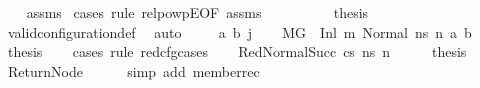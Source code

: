 \begin{isabellebody}
\ \ %
\endisadelimproof
%
\isatagproof
{}\isamarkupfalse%
\ assms\isanewline
{}\isamarkupfalse%
\ {\isacharparenleft}{\kern0pt}cases\ rule{\isacharcolon}{\kern0pt}\ relpowp{\isacharunderscore}{\kern0pt}E{}{\isacharunderscore}{\kern0pt}{}{\isacharbrackleft}{\kern0pt}OF\ assms{\isacharparenleft}{\kern0pt}{}{\isacharparenright}{\kern0pt}{\isacharbrackright}{\kern0pt}{\isacharparenright}{\kern0pt}\isanewline
\ \ \isamarkupfalse%
\ {}\isanewline
\ \ \isamarkupfalse%
\ \isamarkupfalse%
\ {\isacharquery}{\kern0pt}thesis\ \isamarkupfalse%
\ valid{\isacharunderscore}{\kern0pt}configuration{\isacharunderscore}{\kern0pt}def\ \isamarkupfalse%
\ auto\isanewline
{}\isamarkupfalse%
\isanewline
\ \ \isamarkupfalse%
\ {\isacharparenleft}{\kern0pt}{}\ a\ b\ j{\isacharprime}{\kern0pt}{\isacharparenright}{\kern0pt}\isanewline
\ \ \isamarkupfalse%
\ {\isacartoucheopen}M{\isacharcomma}{\kern0pt}{\isasymLambda}{\isacharcomma}{\kern0pt}{\isasymGamma}{\isacharcomma}{\kern0pt}{\isasymOmega}{\isacharcomma}{\kern0pt}G{}\ {\isasymturnstile}\ {\isacharparenleft}{\kern0pt}Inl\ m{}{\isacharcomma}{\kern0pt}\ Normal\ ns{}{\isacharparenright}{\kern0pt}\ {\isacharminus}{\kern0pt}n{\isasymrightarrow}\ {\isacharparenleft}{\kern0pt}a{\isacharcomma}{\kern0pt}\ b{\isacharparenright}{\kern0pt}{\isacartoucheclose}\ \isamarkupfalse%
\ {\isacharquery}{\kern0pt}thesis\isanewline
\ \ \isamarkupfalse%
\ {\isacharparenleft}{\kern0pt}cases\ rule{\isacharcolon}{\kern0pt}\ red{\isacharunderscore}{\kern0pt}cfg{\isachardot}{\kern0pt}cases{\isacharparenright}{\kern0pt}\isanewline
\ \ \isamarkupfalse%
\ {\isacharparenleft}{\kern0pt}RedNormalSucc\ cs\ ns{}{\isacharprime}{\kern0pt}\ n{\isacharprime}{\kern0pt}{\isacharparenright}{\kern0pt}\isanewline
\ \ \isamarkupfalse%
\ \isamarkupfalse%
\ {\isacharquery}{\kern0pt}thesis\ \isamarkupfalse%
\ ReturnNode\isanewline
\ \ \ \ \isamarkupfalse%
\ {\isacharparenleft}{\kern0pt}simp\ add{\isacharcolon}{\kern0pt}\ member{\isacharunderscore}{\kern0pt}rec{\isacharparenleft}{\kern0pt}{}{\isacharparenright}{\kern0pt}{\isacharparenright}{\kern0pt}\isanewline
\ \ \isamarkupfalse%
\isanewline
\ \ \ \ \isamarkupfalse%

\end{isabellebody}

